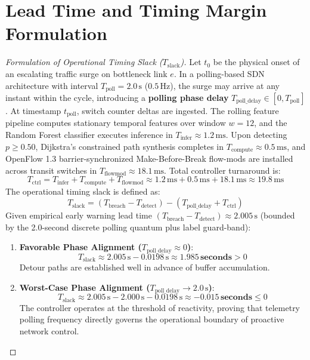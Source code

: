 \section{Lead Time and Timing Margin Formulation}
\begin{proof}[Formulation of Operational Timing Slack ($T_{\text{slack}}$)]
Let $t_0$ be the physical onset of an escalating traffic surge on bottleneck link $e$. In a polling-based SDN architecture with interval $T_{\text{poll}} = 2.0\,\text{s}$ ($0.5\,\text{Hz}$), the surge may arrive at any instant within the cycle, introducing a \textbf{polling phase delay} $T_{\text{poll\_delay}} \in [0, T_{\text{poll}}]$.
At timestamp $t_{\text{poll}}$, switch counter deltas are ingested. The rolling feature pipeline computes stationary temporal features over window $w=12$, and the Random Forest classifier executes inference in $T_{\text{infer}} \approx 1.2\,\text{ms}$.
Upon detecting $p \ge 0.50$, Dijkstra's constrained path synthesis completes in $T_{\text{compute}} \approx 0.5\,\text{ms}$, and OpenFlow 1.3 barrier-synchronized Make-Before-Break flow-mods are installed across transit switches in $T_{\text{flowmod}} \approx 18.1\,\text{ms}$. Total controller turnaround is:
\begin{equation}
  T_{\text{ctrl}} = T_{\text{infer}} + T_{\text{compute}} + T_{\text{flowmod}} \approx 1.2\,\text{ms} + 0.5\,\text{ms} + 18.1\,\text{ms} \approx 19.8\,\text{ms}
\end{equation}
The operational timing slack is defined as:
\begin{equation}
  T_{\text{slack}} = (T_{\text{breach}} - T_{\text{detect}}) - (T_{\text{poll\_delay}} + T_{\text{ctrl}})
\end{equation}
Given empirical early warning lead time $(T_{\text{breach}} - T_{\text{detect}}) \approx 2.005\,\text{s}$ (bounded by the 2.0-second discrete polling quantum plus label guard-band):
\begin{enumerate}[noitemsep]
  \item \textbf{Favorable Phase Alignment ($T_{\text{poll\_delay}} \approx 0$)}:
  \begin{equation}
    T_{\text{slack}} \approx 2.005\,\text{s} - 0.0198\,\text{s} \approx \mathbf{1.985\,\text{seconds}} > 0
  \end{equation}
  Detour paths are established well in advance of buffer accumulation.
  \item \textbf{Worst-Case Phase Alignment ($T_{\text{poll\_delay}} \to 2.0\,\text{s}$)}:
  \begin{equation}
    T_{\text{slack}} \approx 2.005\,\text{s} - 2.000\,\text{s} - 0.0198\,\text{s} \approx \mathbf{-0.015\,\text{seconds}} \le 0
  \end{equation}
  The controller operates at the threshold of reactivity, proving that telemetry polling frequency directly governs the operational boundary of proactive network control.
\end{enumerate}
\end{proof}

